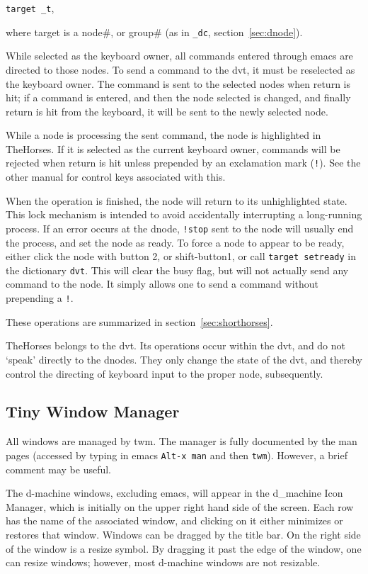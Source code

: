 \documentclass[12pt]{article}
\begin{document}
\verb$target _t$,

where target is a node\#, or group\# (as in \verb$_dc$,
section~\ref{sec:dnode}).

While selected as the keyboard owner, all commands entered through
emacs are directed to those nodes. To send a command to the dvt, it
must be reselected as the keyboard owner. The command is sent to the
selected nodes when return is hit; if a command is entered, and then
the node selected is changed, and finally return is hit from the
keyboard, it will be sent to the newly selected node.

While a node is processing the sent command, the node is highlighted
in TheHorses. If it is selected as the current keyboard owner,
commands will be rejected when return is hit unless prepended by an
exclamation mark (\verb$!$). See the other manual for control keys
associated with this. 

When the operation is finished, the node will return to its
unhighlighted state. This lock mechanism is intended to avoid
accidentally interrupting a long-running process. If an error occurs
at the dnode, \verb$!stop$ sent to the node will usually end the
process, and set the node as ready. To force a node to appear to be
ready, either click the node with button 2, or shift-button1, or call
\verb$target setready$ in the dictionary \verb$dvt$.  This will clear
the busy flag, but will not actually send any command to the node. It
simply allows one to send a command without prepending a \verb$!$.

These operations are summarized in section~\ref{sec:shorthorses}.

TheHorses belongs to the dvt. Its operations occur within the dvt, and
do not `speak' directly to the dnodes. They only change the state of
the dvt, and thereby control the directing of keyboard input to the
proper node, subsequently.


\subsection{Tiny Window Manager}
\label{sec:twm}

All windows are managed by twm. The manager is fully documented by the
man pages (accessed by typing in emacs \verb$Alt-x man$ and then
\verb$twm$). However, a brief comment may be useful.

The d-machine windows, excluding emacs, will appear in the d\_machine
Icon Manager, which is initially on the upper right hand side of the
screen. Each row has the name of the associated window, and clicking
on it either minimizes or restores that window. Windows can be dragged
by the title bar. On the right side of the window is a resize symbol.
By dragging it past the edge of the window, one can resize windows;
however, most d-machine windows are not resizable.
\end{document}
